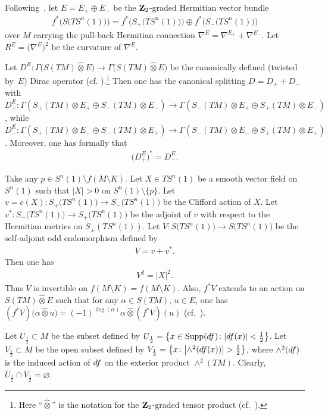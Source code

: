 \documentclass[11pt]{article}
\numberwithin{equation}{section}
\numberwithin{equation}{section}
\theoremstyle{definition}
\begin{document}
Following~\cite{L98}, let $E=E_+\oplus E_-$ be the ${\bf Z}_2$-graded Hermitian vector bundle
\begin{gather}\label{1.4b}
f^*\big(S\big(TS^n(1)\big)\big)=f^*\big(S_+\big(TS^n(1)\big)\big)\oplus f^*\big(S_-\big(TS^n(1)\big)\big)
\end{gather}
over $M$ carrying the pull-back Hermitian connection $\nabla^E=\nabla^{E_+}+\nabla^{E_-}$. Let $R^E=\big(\nabla^E\big)^2$ be the curvature of $\nabla^E$.

Let $D^E\colon \Gamma\big(S(TM)\widehat\otimes E\big)\rightarrow
\Gamma\big(S(TM)\widehat\otimes E\big)$ be the canonically defined (twisted by~$E$) Dirac operator (cf. \cite{LaMi89}).\footnote{Here ``$\widehat\otimes$'' is the notation for the ${\bf Z}_2$-graded tensor product (cf.~\cite{Q85}).} Then one has the canonical splitting $D=D_++D_-$ with $D^E_+\colon \Gamma(S_+(TM) \otimes E_+\oplus S_-(TM)\otimes E_-) \rightarrow \Gamma(S_-(TM) \otimes E_+\oplus S_+(TM)\otimes E_-) $, while $D^E_-\colon \Gamma(S_+(TM) \otimes E_-\oplus S_-(TM)\otimes E_+) \rightarrow \Gamma(S_-(TM) \otimes E_-\oplus S_+(TM)\otimes E_+) $. Moreover, one has formally that
\begin{gather*}%
\big(D^E_+\big)^*=D^E_-.
\end{gather*}

 Take any $p\in S^n(1)\setminus {f(M\setminus K)}$. Let $X\in TS^n(1)$ be a smooth vector field on $S^n(1)$ such that $|X|>0$ on $S^n(1)\setminus \{p\}$. Let $v=c(X)\colon S_+\big(TS^n(1)\big)\rightarrow S_-\big(TS^n(1)\big)$ be the Clifford action of $X$. Let $v^*\colon S_-\big(TS^n(1)\big)\rightarrow S_+\big(TS^n(1)\big)$ be the adjoint of $v$ with respect to the Hermitian metrics on $S_\pm(TS^n(1))$. Let $V\colon S\big(TS^n(1)\big)\rightarrow S\big(TS^n(1)\big)$ be the self-adjoint odd endomorphism defined by
\begin{gather}\label{1.6}
V=v+v^*.
\end{gather}
Then one has
\begin{gather}\label{1.6a}V^2=|X|^2.
\end{gather}
Thus $V$ is invertible on $ {f(M\setminus K)} = \overline {f(M\setminus K)} $. Also, $f^*V$ extends to an action on $S(TM)\widehat\otimes E$ such that for any $\alpha\in S(TM)$, $u\in E$, one has $(f^*V )\big(\alpha\widehat \otimes u\big)=(-1)^{\deg (\alpha)}\alpha\widehat\otimes (f^*V)(u)$ (cf.~\cite{Q85}).

Let $U_{\frac{1}{2}}\subset M$ be the subset defined by
$U_{\frac{1}{2}}=\big\{ x\in \operatorname{Supp}({\rm d}f)\colon |{\rm d}f(x)|<\frac{1}{2}\big\}$. Let $V_{\frac{1}{2}}\subset M$ be the open subset defined by $V_{\frac{1}{2}}=\big\{ x \colon \big|{\wedge}^2({\rm d}f(x))\big|>\frac{1}{2}\big\}$, where $\wedge^2({\rm d}f)$ is the induced action of ${\rm d}f$ on the exterior product $\wedge^2(TM)$. Clearly, $\overline{U}_{\frac{1}{2}}\cap \overline{V}_{\frac{1}{2}}=\varnothing$.
\end{document}
